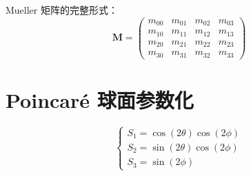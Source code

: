 \documentclass{article}
\begin{document}
Mueller 矩阵的完整形式：
\[
\mathbf{M} = \begin{pmatrix} 
m_{00} & m_{01} & m_{02} & m_{03} \\ 
m_{10} & m_{11} & m_{12} & m_{13} \\ 
m_{20} & m_{21} & m_{22} & m_{23} \\ 
m_{30} & m_{31} & m_{32} & m_{33} 
\end{pmatrix}
\]

\section{Poincaré 球面参数化}

\[
\begin{cases}
S_1 = \cos(2\theta)\cos(2\phi) \\
S_2 = \sin(2\theta)\cos(2\phi) \\
S_3 = \sin(2\phi)
\end{cases}
\]
\end{document}

